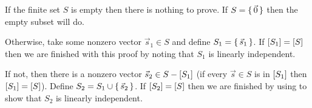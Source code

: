 \begin{exercises}
\begin{answer}
\begin{exparts}
           If the finite set \( S \) is empty then there is nothing to prove.
           If \( S=\mbox{$\{\,\vec{0}\,\}$} \) then the empty subset will do.

           Otherwise, take some nonzero vector \( \vec{s}_1\in S \)
           and define \( S_1=\mbox{$\{\,\vec{s}_1\,\}$} \).
           If \( \relax [S_1\relax ]=\relax [S\relax ] \) then
           we are finished with this proof by noting that \( S_1 \) is linearly
           independent.

           If not, then there is a nonzero
           vector \( \vec{s}_2\in S-\relax [S_1\relax ] \)
           (if every \( \vec{s}\in S \) is in \( \relax [S_1\relax ] \) then
           \( \relax [S_1\relax ]=\relax [S\relax ] \)).
           Define \( S_2=S_1\cup\mbox{$\{\,\vec{s}_2\,\}$} \).
           If \( \relax [S_2\relax ]=\relax [S\relax ] \) then 
           we are finished 
           by using 
           to show that \( S_2 \) is linearly independent.


\end{exparts}
\end{answer}
\end{exercises}
